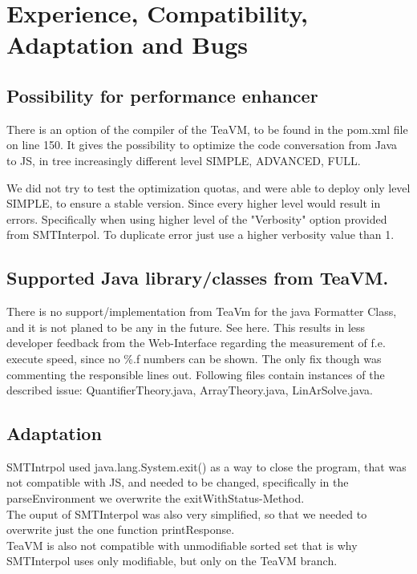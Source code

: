 \documentclass[]{article}
\begin{document}
\section{Experience, Compatibility, Adaptation and Bugs}


\subsection{Possibility for performance enhancer}
There is an option of the compiler of the TeaVM, to be found in the pom.xml file on line 150. It gives the possibility to optimize the code conversation from Java to JS, in tree increasingly different level SIMPLE, ADVANCED, FULL.

We did not try to test the optimization quotas, and were able to deploy only level SIMPLE, to ensure a stable version.
Since every higher level would result in  errors. Specifically when using higher level of the "Verbosity" option provided from SMTInterpol. To duplicate error just use a higher verbosity value than 1.

\subsection{Supported Java library/classes from TeaVM.}
There is no support/implementation from TeaVm for the java Formatter Class, and it is not planed to be any in the future. See here. \cite{4} This results in less developer feedback from the Web-Interface regarding the measurement of f.e. execute speed, since no \%.f numbers can be shown. The only fix though was commenting the responsible lines out.
Following files contain instances of the described issue: QuantifierTheory.java, ArrayTheory.java, LinArSolve.java.

\subsection{Adaptation}
SMTIntrpol used java.lang.System.exit() as a way to close the program, that was not compatible with JS, and needed to be changed, specifically in the parseEnvironment we overwrite the exitWithStatus-Method. \\

The ouput of SMTInterpol was also very simplified, so that we needed to overwrite just the one function printResponse.\\

TeaVM is also not compatible with unmodifiable sorted set that is why SMTInterpol uses only modifiable, but only on the TeaVM branch.
\end{document}
